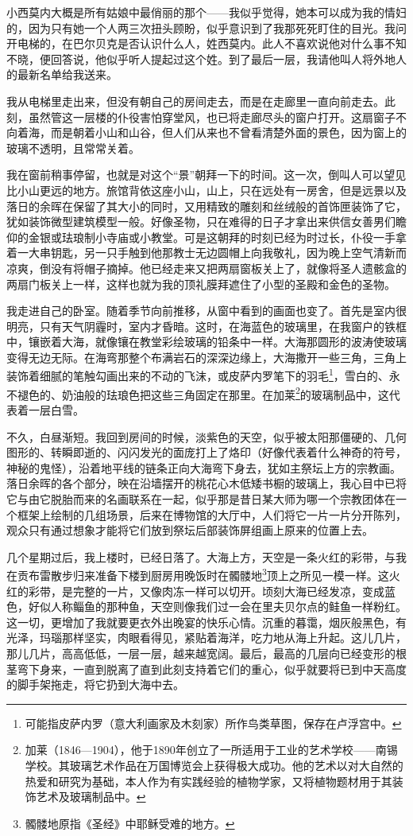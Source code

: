 \par 小西莫内大概是所有姑娘中最俏丽的那个——我似乎觉得，她本可以成为我的情妇的，因为只有她一个人两三次扭头顾盼，似乎意识到了我那死死盯住的目光。我问开电梯的，在巴尔贝克是否认识什么人，姓西莫内。此人不喜欢说他对什么事不知不晓，便回答说，他似乎听人提起过这个姓。到了最后一层，我请他叫人将外地人的最新名单给我送来。
\par 我从电梯里走出来，但没有朝自己的房间走去，而是在走廊里一直向前走去。此刻，虽然管这一层楼的仆役害怕穿堂风，也已将走廊尽头的窗户打开。这扇窗子不向着海，而是朝着小山和山谷，但人们从来也不曾看清楚外面的景色，因为窗上的玻璃不透明，且常常关着。
\par 我在窗前稍事停留，也就是对这个“景”朝拜一下的时间。这一次，倒叫人可以望见比小山更远的地方。旅馆背依这座小山，山上，只在远处有一房舍，但是远景以及落日的余晖在保留了其大小的同时，又用精致的雕刻和丝绒般的首饰匣装饰了它，犹如装饰微型建筑模型一般。好像圣物，只在难得的日子才拿出来供信女善男们瞻仰的金银或珐琅制小寺庙或小教堂。可是这朝拜的时刻已经为时过长，仆役一手拿着一大串钥匙，另一只手触到他那教士无边圆帽上向我敬礼，因为晚上空气清新而凉爽，倒没有将帽子摘掉。他已经走来又把两扇窗板关上了，就像将圣人遗骸盒的两扇门板关上一样，这样也就为我的顶礼膜拜遮住了小型的圣殿和金色的圣物。
\par 我走进自己的卧室。随着季节向前推移，从窗中看到的画面也变了。首先是室内很明亮，只有天气阴霾时，室内才昏暗。这时，在海蓝色的玻璃里，在我窗户的铁框中，镶嵌着大海，就像镶在教堂彩绘玻璃的铅条中一样。大海那圆形的波涛使玻璃变得无边无际。在海弯那整个布满岩石的深深边缘上，大海撒开一些三角，三角上装饰着细腻的笔触勾画出来的不动的飞沫，或皮萨内罗笔下的羽毛\footnote{可能指皮萨内罗（意大利画家及木刻家）所作鸟类草图，保存在卢浮宫中。}，雪白的、永不褪色的、奶油般的珐琅色把这些三角固定在那里。在加莱\footnote{加莱（1846—1904），他于1890年创立了一所适用于工业的艺术学校——南锡学校。其玻璃艺术作品在万国博览会上获得极大成功。他的艺术以对大自然的热爱和研究为基础，本人作为有实践经验的植物学家，又将植物题材用于其装饰艺术及玻璃制品中。}的玻璃制品中，这代表着一层白雪。
\par 不久，白昼渐短。我回到房间的时候，淡紫色的天空，似乎被太阳那僵硬的、几何图形的、转瞬即逝的、闪闪发光的面庞打上了烙印（好像代表着什么神奇的符号，神秘的鬼怪），沿着地平线的链条正向大海弯下身去，犹如主祭坛上方的宗教画。落日余晖的各个部分，映在沿墙摆开的桃花心木低矮书橱的玻璃上，我心目中已将它与由它脱胎而来的名画联系在一起，似乎那是昔日某大师为哪一个宗教团体在一个框架上绘制的几组场景，后来在博物馆的大厅中，人们将它一片一片分开陈列，观众只有通过想象才能将它们放到祭坛后部装饰屏组画上原来的位置上去。
\par 几个星期过后，我上楼时，已经日落了。大海上方，天空是一条火红的彩带，与我在贡布雷散步归来准备下楼到厨房用晚饭时在髑髅地\footnote{髑髅地原指《圣经》中耶稣受难的地方。}顶上之所见一模一样。这火红的彩带，是完整的一片，又像肉冻一样可以切开。顷刻大海已经发凉，变成蓝色，好似人称鲻鱼的那种鱼，天空则像我们过一会在里夫贝尔点的鲑鱼一样粉红。这一切，更增加了我就要更衣外出晚宴的快乐心情。沉重的暮霭，烟灰般黑色，有光泽，玛瑙那样坚实，肉眼看得见，紧贴着海洋，吃力地从海上升起。这儿几片，那儿几片，高高低低，一层一层，越来越宽阔。最后，最高的几层向已经变形的根茎弯下身来，一直到脱离了直到此刻支持着它们的重心，似乎就要将已到中天高度的脚手架拖走，将它扔到大海中去。
